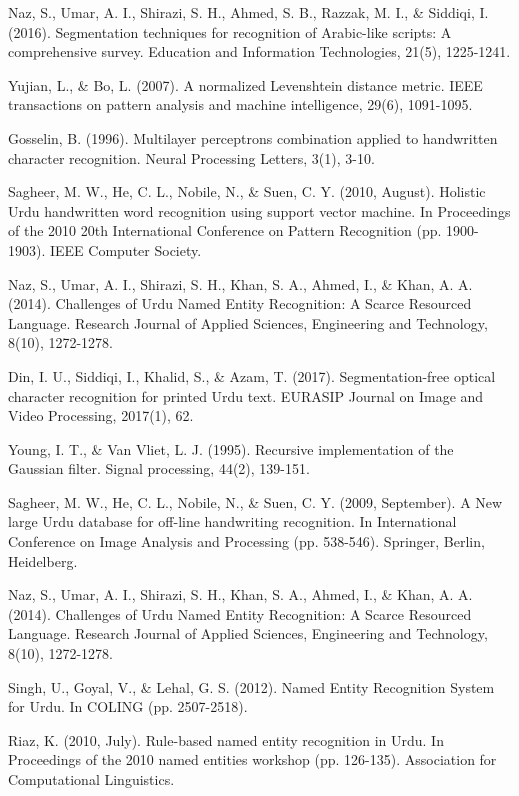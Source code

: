 \documentclass[a4paper,conference]{IEEEtran}
\begin{document}
\begin{thebibliography}{130}
Naz, S., Umar, A. I., Shirazi, S. H., Ahmed, S. B., Razzak, M. I., \& Siddiqi, I. (2016). Segmentation techniques for recognition of Arabic-like scripts: A comprehensive survey. Education and Information Technologies, 21(5), 1225-1241.

Yujian, L., \& Bo, L. (2007). A normalized Levenshtein distance metric. IEEE transactions on pattern analysis and machine intelligence, 29(6), 1091-1095.

Gosselin, B. (1996). Multilayer perceptrons combination applied to handwritten character recognition. Neural Processing Letters, 3(1), 3-10.

Sagheer, M. W., He, C. L., Nobile, N., \& Suen, C. Y. (2010, August). Holistic Urdu handwritten word recognition using support vector machine. In Proceedings of the 2010 20th International Conference on Pattern Recognition (pp. 1900-1903). IEEE Computer Society.

Naz, S., Umar, A. I., Shirazi, S. H., Khan, S. A., Ahmed, I., \& Khan, A. A. (2014). Challenges of Urdu Named Entity Recognition: A Scarce Resourced Language. Research Journal of Applied Sciences, Engineering and Technology, 8(10), 1272-1278.

Din, I. U., Siddiqi, I., Khalid, S., \& Azam, T. (2017). Segmentation-free optical character recognition for printed Urdu text. EURASIP Journal on Image and Video Processing, 2017(1), 62.

Young, I. T., \& Van Vliet, L. J. (1995). Recursive implementation of the Gaussian filter. Signal processing, 44(2), 139-151.

Sagheer, M. W., He, C. L., Nobile, N., \& Suen, C. Y. (2009, September). A New large Urdu database for off-line handwriting recognition. In International Conference on Image Analysis and Processing (pp. 538-546). Springer, Berlin, Heidelberg.

Naz, S., Umar, A. I., Shirazi, S. H., Khan, S. A., Ahmed, I., \& Khan, A. A. (2014). Challenges of Urdu Named Entity Recognition: A Scarce Resourced Language. Research Journal of Applied Sciences, Engineering and Technology, 8(10), 1272-1278.

Singh, U., Goyal, V., \& Lehal, G. S. (2012). Named Entity Recognition System for Urdu. In COLING (pp. 2507-2518).

Riaz, K. (2010, July). Rule-based named entity recognition in Urdu. In Proceedings of the 2010 named entities workshop (pp. 126-135). Association for Computational Linguistics.


\end{thebibliography}
\end{document}
